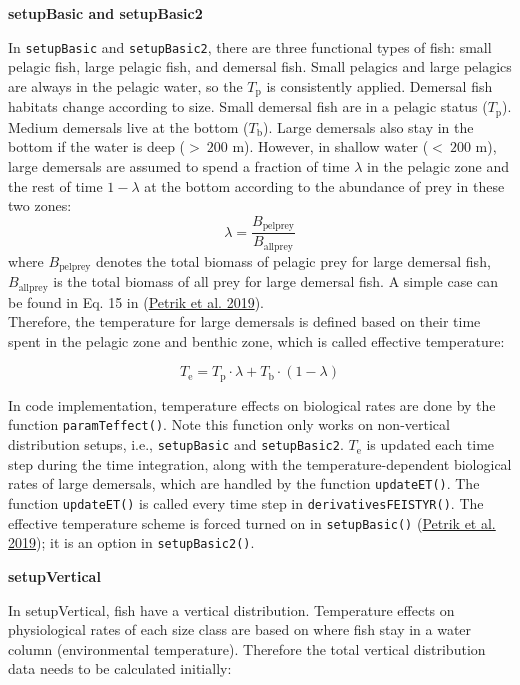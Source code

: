 \documentclass[
]{article}
\begin{document}
\textbf{setupBasic and setupBasic2}

In \texttt{setupBasic} and \texttt{setupBasic2}, there are three
functional types of fish: small pelagic fish, large pelagic fish, and
demersal fish. Small pelagics and large pelagics are always in the
pelagic water, so the \(T_{\mathrm{p}}\) is consistently applied.
Demersal fish habitats change according to size. Small demersal fish are
in a pelagic status (\(T_{\mathrm{p}}\)). Medium demersals live at the
bottom (\(T_{\mathrm{b}}\)). Large demersals also stay in the bottom if
the water is deep (\(>~200\) m). However, in shallow water (\(<~200\)
m), large demersals are assumed to spend a fraction of time \(\lambda\)
in the pelagic zone and the rest of time \(1-\lambda\) at the bottom
according to the abundance of prey in these two zones: \begin{equation}
\lambda = \frac{B_{\mathrm{pelprey}}}{B_{\mathrm{allprey}}}
\end{equation} where \(B_{\mathrm{pelprey}}\) denotes the total biomass
of pelagic prey for large demersal fish, \(B_{\mathrm{allprey}}\) is the
total biomass of all prey for large demersal fish. A simple case can be
found in Eq. 15 in (\protect\hyperlink{ref-petrik2019bottom}{Petrik et
al. 2019}).\\
Therefore, the temperature for large demersals is defined based on their
time spent in the pelagic zone and benthic zone, which is called
effective temperature:

\begin{equation} 
T_{\mathrm{e}} = T_{\mathrm{p}} \cdot \lambda + T_{\mathrm{b}} \cdot (1 - \lambda)
\end{equation}

In code implementation, temperature effects on biological rates are done
by the function \texttt{paramTeffect()}. Note this function only works
on non-vertical distribution setups, i.e., \texttt{setupBasic} and
\texttt{setupBasic2}. \(T_{\mathrm{e}}\) is updated each time step
during the time integration, along with the temperature-dependent
biological rates of large demersals, which are handled by the function
\texttt{updateET()}. The function \texttt{updateET()} is called every
time step in \texttt{derivativesFEISTYR()}. The effective temperature
scheme is forced turned on in \texttt{setupBasic()}
(\protect\hyperlink{ref-petrik2019bottom}{Petrik et al. 2019}); it is an
option in \texttt{setupBasic2()}.

\textbf{setupVertical}

In setupVertical, fish have a vertical distribution. Temperature effects
on physiological rates of each size class are based on where fish stay
in a water column (environmental temperature). Therefore the total
vertical distribution data needs to be calculated initially:
\end{document}
